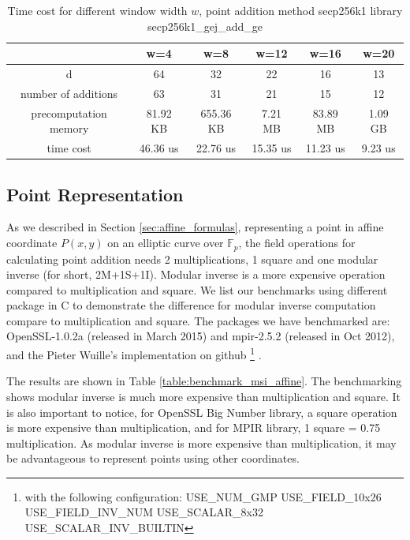 \begin{table}[h]
	\centering
	\caption{Time cost for different window width $w$, point addition method secp256k1 library \cite{Wulliesecp256k1} secp256k1\_gej\_add\_ge }
	\label{tb:benchmarkWindowSize1}
	\begin{tabular}{|c|c|c|c|c|c|}
		\hline
		& w=4 & w=8 & w=12 & w=16 & w=20 \\ \hline
		d         & 64  & 32  &  22  & 16   &   13   \\ \hline
		number of additions & 63 & 31 & 21 & 15 & 12 \\ \hline
		precomputation memory & 81.92 KB & 655.36 KB & 7.21 MB & 83.89 MB & 1.09 GB \\ \hline 
		time cost &  46.36 us & 22.76 us  &  15.35 us & 11.23 us &  9.23 us \\ \hline
	\end{tabular}
\end{table}
\subsection{Point Representation} \label{sec:pointRep}
As we described in Section \ref{sec:affine_formulas}, representing a point in affine coordinate $P(x,y)$ on an elliptic curve over $\mathbb{F}_p$, the field operations for calculating point addition needs 2 multiplications, 1 square and one modular inverse (for short, 2M+1S+1I). Modular inverse is a more expensive operation compared to multiplication and square. We list our benchmarks using different package in C to demonstrate the difference for modular inverse computation compare to multiplication and square. The packages we have benchmarked are: OpenSSL-1.0.2a (released in March 2015) and mpir-2.5.2 (released in Oct 2012), and the Pieter Wuille's implementation on github \cite{Wulliesecp256k1} \footnote{with the following configuration: USE\_NUM\_GMP USE\_FIELD\_10x26 USE\_FIELD\_INV\_NUM USE\_SCALAR\_8x32 USE\_SCALAR\_INV\_BUILTIN} . 


 The results are shown in Table \ref{table:benchmark_msi_affine}. The benchmarking shows modular inverse is much more expensive than multiplication and square. It is also important to notice, for OpenSSL Big Number library, a square operation is more expensive than multiplication, and for MPIR library, 1 square = 0.75 multiplication. As modular inverse is more expensive than multiplication, it may be advantageous to represent points using other coordinates.
 
